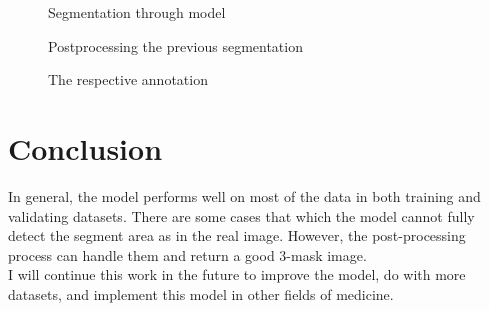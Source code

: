 \documentclass{article}
\begin{document}
\begin{figure}[hbt!]%
    \centering
    \qquad
    \caption{Segmentation through model}%
    \label{fig:output}%
\end{figure}

\begin{figure}[hbt!]%
    \centering
    \qquad
    \caption{Postprocessing the previous segmentation}%
    \label{fig:processed}%
\end{figure}

\begin{figure}[hbt!]%
    \centering
    \qquad
    \caption{The respective annotation}%
    \label{fig:annotation}%
\end{figure}

\section{Conclusion}
In general, the model performs well on most of the data in both training and validating datasets. There are some cases that which the model cannot fully detect the segment area as in the real image. However, the post-processing process can handle them and return a good 3-mask image.\\
I will continue this work in the future to improve the model, do with more datasets, and implement this model in other fields of medicine.
\end{document}
